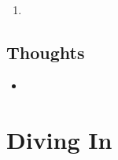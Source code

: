 \documentclass{article}
\begin{document}
\begin{enumerate}
	\item 
\end{enumerate}


\subsection{Thoughts}

\begin{itemize}
	\item 
\end{itemize}


 

\section{Diving In}







\end{document}
